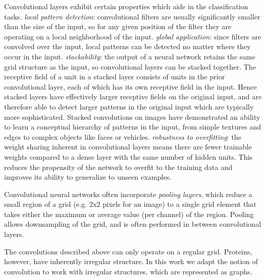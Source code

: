 Convolutional layers exhibit certain properties which aide in the classification tasks.
\textit{local pattern detection}: convolutional filters are usually significantly smaller than the size of the input, so for any given position of the filter they are operating on a local neighborhood of the input. 
\textit{global application}: since filters are convolved over the input, local patterns can be detected no matter where they occur in the input.
\textit{stackability}: the output of a neural network retains the same grid structure as the input, so convolutional layers can be stacked together.
The receptive field of a unit in a stacked layer consists of units in the prior convolutional layer, each of which has its own receptive field in the input.
Hence stacked layers have effectively larger receptive fields on the original input, and are therefore able to detect larger patterns in the original input which are typically more sophisticated.
Stacked convolutions on images have demonstrated an ability to learn a conceptual hierarchy of patterns in the input, from simple textures and edges to complex objects like faces or vehicles. 
\textit{robustness to overfitting}: the weight sharing inherent in convolutional layers means there are fewer trainable weights compared to a dense layer with the same number of hidden units. 
This reduces the propensity of the network to overfit to the training data and improves its ability to generalize to unseen examples.

Convolutional neural networks often incorporate \textit{pooling layers}, which reduce a small region of a grid (e.g. 2x2 pixels for an image) to a single grid element that takes either the maximum or average value (per channel) of the region. 
Pooling allows downsampling of the grid, and is often performed in between convolutional layers. 

The convolutions described above can only operate on a regular grid. 
Proteins, however, have inherently irregular structure. 
In this work we adapt the notion of convolution to work with irregular structures, which are represented as graphs. 





